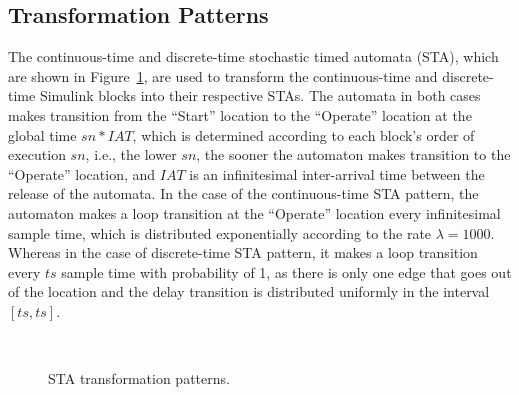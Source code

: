 \subsection*{Transformation Patterns} 
The continuous-time and discrete-time stochastic timed automata (STA), which are shown in Figure~\ref{fig_patterns}, are used to transform the continuous-time and discrete-time Simulink blocks into their respective STAs. The automata in both cases makes transition from the ``Start'' location to the ``Operate'' location at the global time $sn*IAT$, which is determined according to each block's order of execution $sn$, i.e., the lower $sn$, the sooner the automaton makes  transition to the ``Operate'' location, and $IAT$ is an infinitesimal inter-arrival time between the release of the automata. In the case of the continuous-time STA pattern, the automaton makes a loop transition at the ``Operate'' location every infinitesimal sample time, which is distributed exponentially according to the rate  $\lambda=1000$. Whereas in the case of discrete-time STA pattern, it makes a loop transition every $ts$ sample time with probability of 1, as there is only one edge that goes out of the location and the delay transition is distributed uniformly in the interval $[ts,ts]$.
\begin{figure}[h] 
	\centering
	 ~
	\caption{STA transformation patterns.} 
	\label{fig_patterns}
\end{figure}

